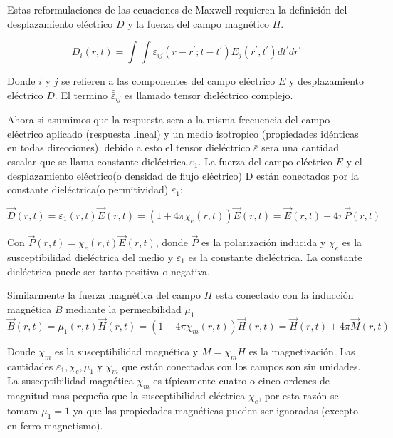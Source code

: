 \documentclass[a4paper,openright,12pt]{book}
\begin{document}
Estas reformulaciones de las ecuaciones de Maxwell requieren la definición del desplazamiento eléctrico $D$ y la fuerza del campo magnético $H$.


\begin{equation}\label{desplazamientoelectrico1}
D_{i}(r,t)=\int\int \bar{\bar{\varepsilon}}_{ij}(r-r^{'};t-t^{'})E_{j}(r^{'},t^{'})dt^{'}dr^{'}
\end{equation}

Donde $i$ y $j$ se refieren a las componentes del campo eléctrico $E$ y desplazamiento eléctrico $D$. El termino $\bar{\bar{\varepsilon}}_{ij}$ es llamado tensor dieléctrico complejo.

Ahora si asumimos que la respuesta sera a la misma frecuencia del campo eléctrico aplicado (respuesta lineal) y un medio isotropico (propiedades idénticas en todas direcciones), debido a esto el tensor dieléctrico $\bar{\bar{\varepsilon}}$ sera una cantidad escalar que se llama constante dieléctrica $\varepsilon_{1}$. La fuerza del campo eléctrico $E$ y el desplazamiento eléctrico(o densidad de flujo eléctrico) D están conectados por la constante dieléctrica(o permitividad) $\varepsilon_{1}$:

\begin{equation}\label{1.5}
\vec{D}(r,t)=\varepsilon_{1}(r,t)\vec{E}(r,t)=(1+4\pi\chi_{e}(r,t))\vec{E}(r,t)=\vec{E}(r,t)+4\pi \vec{P}(r,t)
\end{equation}

Con $\vec{P}(r,t)=\chi_{e}(r,t)\vec{E}(r,t)$, donde $\vec{P}$ es la polarización inducida y $\chi_{e}$ es la susceptibilidad dieléctrica del medio y $\varepsilon_{1}$ es la constante dieléctrica. La constante dieléctrica puede ser tanto positiva o negativa.

Similarmente la fuerza magnética del campo $H$ esta conectado con la inducción magnética $B$
mediante la permeabilidad $\mu_{1}$
\begin{equation}\label{1.6}
\vec{B}(r,t)=\mu_{1}(r,t)\vec{H}(r,t)=(1+4\pi \chi_{m}(r,t))\vec{H}(r,t)=\vec{H}(r,t)+4\pi \vec{M}(r,t)
\end{equation}

Donde $\chi_{m}$ es la susceptibilidad magnética y $M=\chi_{m} H$ es la magnetización. Las cantidades $\varepsilon_{1},\chi_{e},\mu_{1}$ y $\chi_{m}$ que están conectadas con los campos son sin unidades. La susceptibilidad magnética $\chi_{m}$ es típicamente cuatro o cinco ordenes de magnitud mas pequeña que la susceptibilidad eléctrica $\chi_{e}$, por esta razón se tomara $\mu_{1}=1$ ya que las propiedades magnéticas pueden ser ignoradas (excepto en ferro-magnetismo).
\end{document}
